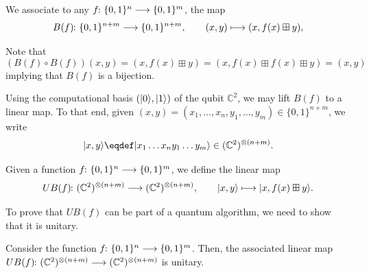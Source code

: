 \documentclass[a4paper, oneside, 12pt]{amsart}
\begin{document}
\begin{remark}\label{rmk:Bennetts-trick}
  We associate to any \( f \from \{0,1\}^n \to \{0,1\}^m \), the map
  \begin{equation*}
    B(f) \from \{0,1\}^{n+m} \to \{0,1\}^{n+m}, \qquad (x,y) \mapsto (x, f(x) \boxplus y),
  \end{equation*}

  Note that
  \begin{equation*}
    (B(f) \circ B(f))(x,y) = (x, f(x) \boxplus y) = (x, f(x) \boxplus f(x) \boxplus y) = (x,y)
  \end{equation*}
  implying that \(B(f)\) is a bijection.
\end{remark}

Using the computational basis \(( \lvert0\rangle, \lvert1\rangle )\) of  the qubit \( \mathbb{C}^{2}\),
we may lift \(B(f)\) to a linear map.
To that end, given \((x,y)= (x_{1}, \dots , x_{n}, y_{1}, \dots , y_{m}) \in\{0,1\}^{n+m}\), we write
\begin{equation}
  \ket{x,y}\eqdef \ket{x_{1}\dots x_{n}y_{1}\dots y_{m}} \in ( \mathbb{C}^{2})^{\otimes(n+m)}.
\end{equation}


\begin{definition}\label{def:associated-unitary}
  Given a function \( f \from \{0,1\}^n \to \{0,1\}^m \), we define the linear map
  \begin{equation}
    UB(f) \from (\mathbb{C}^2)^{\otimes (n+m)} \to (\mathbb{C}^2)^{\otimes (n+m)}, \qquad \ket{x,y} \mapsto \ket{x, f(x) \boxplus y}.
  \end{equation}
\end{definition}

To prove that \(UB(f)\) can be part of a quantum algorithm, we need to show that it is unitary.

\begin{proposition}\label{prop:associated-unitary-is-unitary}
  Consider the function \( f \from \{0,1\}^n \to \{0,1\}^m \).
  Then, the associated linear map \( UB(f) \from ( \mathbb{C}^{2})^{\otimes (n+m)} \to ( \mathbb{C}^{2})^{\otimes (n+m)} \) is unitary.
\end{proposition}
\end{document}
